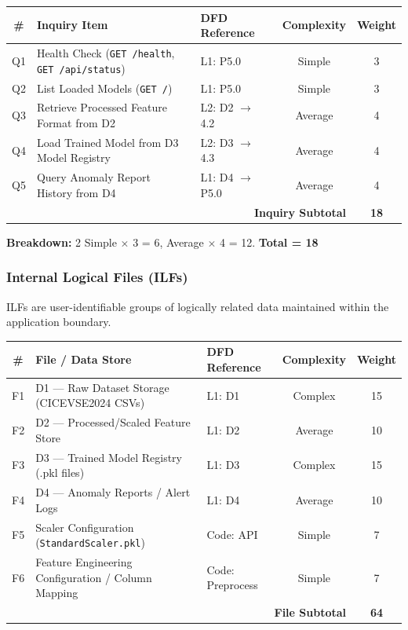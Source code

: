 \documentclass[11pt, a4paper]{article}
\begin{document}
\begin{center}
\begin{tabular}{|c|l|l|c|c|}
\hline
\textbf{\#} & \textbf{Inquiry Item} & \textbf{DFD Reference} & \textbf{Complexity} & \textbf{Weight} \\ \hline
Q1 & Health Check (\texttt{GET /health}, \texttt{GET /api/status}) & L1: P5.0    & Simple   & 3 \\ \hline
Q2 & List Loaded Models (\texttt{GET /})                           & L1: P5.0    & Simple   & 3 \\ \hline
Q3 & Retrieve Processed Feature Format from D2                     & L2: D2 $\to$ 4.2 & Average & 4 \\ \hline
Q4 & Load Trained Model from D3 Model Registry                    & L2: D3 $\to$ 4.3 & Average & 4 \\ \hline
Q5 & Query Anomaly Report History from D4                          & L1: D4 $\to$ P5.0 & Average & 4 \\ \hline
\multicolumn{4}{|r|}{\textbf{Inquiry Subtotal}} & \textbf{18} \\ \hline
\end{tabular}
\end{center}

\textbf{Breakdown:} 2 Simple $\times$ 3 = 6,  Average $\times$ 4 = 12. \quad \textbf{Total = 18}

\subsubsection{Internal Logical Files (ILFs)}
ILFs are user-identifiable groups of logically related data maintained within the application boundary.

\begin{center}
\begin{tabular}{|c|l|l|c|c|}
\hline
\textbf{\#} & \textbf{File / Data Store} & \textbf{DFD Reference} & \textbf{Complexity} & \textbf{Weight} \\ \hline
F1 & D1 --- Raw Dataset Storage (CICEVSE2024 CSVs)       & L1: D1       & Complex  & 15 \\ \hline
F2 & D2 --- Processed/Scaled Feature Store                & L1: D2       & Average  & 10 \\ \hline
F3 & D3 --- Trained Model Registry (.pkl files)           & L1: D3       & Complex  & 15 \\ \hline
F4 & D4 --- Anomaly Reports / Alert Logs                  & L1: D4       & Average  & 10 \\ \hline
F5 & Scaler Configuration (\texttt{StandardScaler.pkl})   & Code: API    & Simple   & 7  \\ \hline
F6 & Feature Engineering Configuration / Column Mapping    & Code: Preprocess & Simple & 7 \\ \hline
\multicolumn{4}{|r|}{\textbf{File Subtotal}} & \textbf{64} \\ \hline
\end{tabular}
\end{center}
\end{document}
